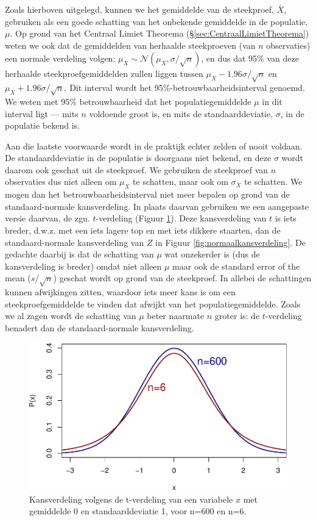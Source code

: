 \documentclass[
]{book}
\begin{document}
Zoals hierboven uitgelegd, kunnen we het gemiddelde van de steekproef,
\(\bar{X}\), gebruiken als een goede schatting van het onbekende
gemiddelde in de populatie, \(\mu\). Op grond van het Centraal Limiet
Theorema (§\ref{sec:CentraalLimietTheorema}) weten we ook dat de gemiddelden
van herhaalde steekproeven (van \(n\) observaties) een normale verdeling
volgen: \(\mu_{\bar{X}} \sim \mathcal{N}(\mu_{X},\sigma/\sqrt{n})\), en
dus dat 95\% van deze herhaalde steekproefgemiddelden zullen liggen
tussen \(\mu_{X}-1.96\sigma/\sqrt{n}\) en \(\mu_{X}+1.96\sigma/\sqrt{n}\).
Dit interval wordt het 95\%-betrouwbaarheidsinterval genoemd. We weten
met 95\% betrouwbaarheid dat het populatiegemiddelde \(\mu\) in dit
interval ligt --- mits \(n\) voldoende groot is, en mits de
standaarddeviatie, \(\sigma\), in de populatie bekend is.

Aan die laatste voorwaarde wordt in de praktijk echter zelden of nooit
voldaan. De standaarddeviatie in de populatie is doorgaans niet bekend,
en deze \(\sigma\) wordt daarom ook geschat uit de steekproef. We
gebruiken de steekproef van \(n\) observaties dus niet alleen om \(\mu_X\)
te schatten, maar ook om \(\sigma_X\) te schatten. We mogen dan het
betrouwbaarheidsinterval niet meer bepalen op grond van de
standaard-normale kansverdeling. In plaats daarvan gebruiken we een
aangepaste versie daarvan, de zgn. \(t\)-verdeling
(Figuur \ref{fig:tkansverdeling}). Deze kansverdeling van \(t\) is iets
breder, d.w.z. met een iets lagere top en met iets dikkere staarten, dan
de standaard-normale kansverdeling van \(Z\) in
Figuur \ref{fig:normaalkansverdeling}.
De gedachte daarbij is dat de
schatting van \(\mu\) wat onzekerder is (dus de kansverdeling is breder)
omdat niet alleen \(\mu\) maar ook de standard error of the mean
(\(s/\sqrt{n}\)) geschat wordt op grond van de steekproef. In allebei de
schattingen kunnen afwijkingen zitten, waardoor iets meer kans is om een
steekproefgemiddelde te vinden dat afwijkt van het populatiegemiddelde.
Zoals we al zagen wordt de schatting van \(\mu\) beter naarmate \(n\) groter
is: de \(t\)-verdeling benadert dan de standaard-normale kansverdeling.

\begin{figure}
\centering
\includegraphics{KMS-NL_files/figure-latex/tkansverdeling-1.pdf}
\caption{\label{fig:tkansverdeling}Kansverdeling volgens de t-verdeling van een variabele \(x\) met gemiddelde 0 en standaarddeviatie 1, voor n=600 en n=6.}
\end{figure}
\end{document}
